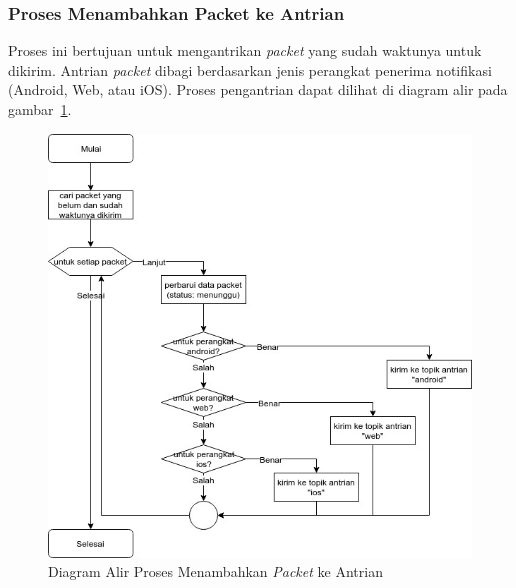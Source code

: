 \subsubsection{Proses Menambahkan Packet ke Antrian}
\par Proses ini bertujuan untuk mengantrikan \textit{packet} yang sudah waktunya untuk dikirim.
Antrian \textit{packet} dibagi berdasarkan jenis perangkat penerima notifikasi (Android, Web, atau iOS). Proses pengantrian dapat dilihat di diagram alir pada gambar~\ref{flowchart_menambahkan_packet_ke_antrian}.
\begin{figure}[H]
    \centering\includegraphics[width=1\textwidth]{bab3/figures/flowchart_menambahkan_packet_ke_antrian.jpg}
    \caption{Diagram Alir Proses Menambahkan \textit{Packet} ke Antrian}
    \label{flowchart_menambahkan_packet_ke_antrian}
\end{figure}


